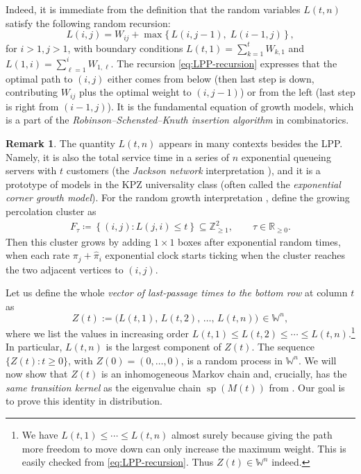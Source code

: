 \documentclass[letterpaper,11pt,oneside,reqno]{article}
\numberwithin{equation}{section}
\theoremstyle{definition}
\newtheorem{remark}[proposition]{Remark}
\begin{document}
Indeed, it is immediate from the definition that the random
variables $L(t,n)$ satisfy the following random recursion:
\begin{equation}\label{eq:LPP-recursion}
L(i,j) = W_{ij} + \max\{\, L(i,j-1),\; L(i-1,j)\,\}\,,
\end{equation}
for $i>1, j>1$, with boundary conditions $L(t,1) =
\sum_{k=1}^t W_{k,1}$ and $L(1,i) =
\sum_{\ell=1}^i W_{1,\ell}$.
The recursion \eqref{eq:LPP-recursion} expresses
that the optimal path to $(i,j)$ either comes from below
(then last step is down, contributing $W_{ij}$ plus the
optimal weight to $(i,j-1)$) or from the left (last step is
right from $(i-1,j)$). It is the fundamental equation of
growth models, which is a part of the
\emph{Robinson--Schensted--Knuth insertion algorithm} in
combinatorics.


\begin{remark}
	The quantity $L(t,n)$ appears in many contexts besides the LPP.
	Namely,
it is also the total
service time in a series of $n$ exponential queueing servers
with $t$ customers (the \emph{Jackson network}
interpretation \cite{Baryshnikov_GUE2001}), and it is a
prototype of models in the KPZ universality class (often
called the \emph{exponential corner growth model}).
For the random growth interpretation \cite{johansson2000shape},
define the growing percolation cluster as
\begin{equation*}
\begin{split}
F_\tau\coloneqq
\left\{ (i,j)\colon L(j,i)\le t \right\} \subseteq \mathbb{Z}_{\ge1}^2,
\qquad \tau \in \mathbb{R}_{\ge0}.
\end{split}
\end{equation*}
Then this cluster grows by adding $1\times 1$ boxes
after exponential random times, when
each rate $\pi_j+\hat \pi_i$
exponential clock starts ticking
when the cluster reaches the two adjacent vertices
to $(i,j)$.
\end{remark}

Let us define the whole \emph{vector of last-passage times to the bottom row} at column $t$ as
\[ Z(t) := \big( L(t,1),\, L(t,2),\, \dots,\, L(t,n)\big)\,\in \mathbb{W}^n, \]
where we list the values in increasing order $L(t,1)\le
L(t,2)\le \cdots \le L(t,n)$.\footnote{We have $L(t,1)\le
\cdots\le L(t,n)$ almost surely because giving the path more
freedom to move down can only increase the maximum weight.
This is easily checked from \eqref{eq:LPP-recursion}. Thus
$Z(t)\in \mathbb{W}^n$ indeed.} In particular, $L(t,n)$ is
the largest component of $Z(t)$. The sequence
$\{Z(t):t\ge0\}$, with $Z(0)=(0,\dots,0)$, is a random
process in $\mathbb{W}^n$. We will now show that $Z(t)$ is an inhomogeneous Markov
chain and, crucially, has the \emph{same transition kernel}
as the eigenvalue chain $\operatorname{sp}(M(t))$ from
. Our goal is to prove this identity in distribution.
\end{document}
